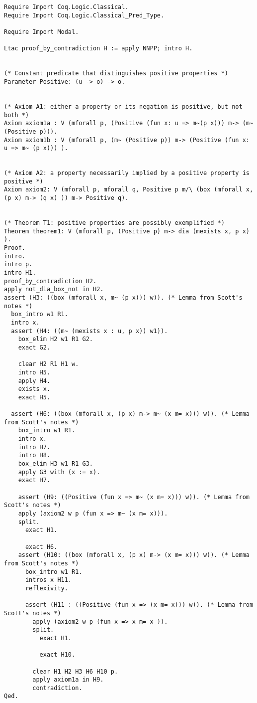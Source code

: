 \documentclass{llncs}
\begin{document}
\begin{verbatim}
Require Import Coq.Logic.Classical.
Require Import Coq.Logic.Classical_Pred_Type.

Require Import Modal.

Ltac proof_by_contradiction H := apply NNPP; intro H.


(* Constant predicate that distinguishes positive properties *)
Parameter Positive: (u -> o) -> o.


(* Axiom A1: either a property or its negation is positive, but not both *)
Axiom axiom1a : V (mforall p, (Positive (fun x: u => m~(p x))) m-> (m~ (Positive p))).
Axiom axiom1b : V (mforall p, (m~ (Positive p)) m-> (Positive (fun x: u => m~ (p x))) ).


(* Axiom A2: a property necessarily implied by a positive property is positive *)
Axiom axiom2: V (mforall p, mforall q, Positive p m/\ (box (mforall x, (p x) m-> (q x) )) m-> Positive q).


(* Theorem T1: positive properties are possibly exemplified *)
Theorem theorem1: V (mforall p, (Positive p) m-> dia (mexists x, p x) ).
Proof.
intro.
intro p.
intro H1.
proof_by_contradiction H2.
apply not_dia_box_not in H2.
assert (H3: ((box (mforall x, m~ (p x))) w)). (* Lemma from Scott's notes *)
  box_intro w1 R1.
  intro x.
  assert (H4: ((m~ (mexists x : u, p x)) w1)).
    box_elim H2 w1 R1 G2. 
    exact G2.

    clear H2 R1 H1 w.
    intro H5.
    apply H4.
    exists x.
    exact H5.

  assert (H6: ((box (mforall x, (p x) m-> m~ (x m= x))) w)). (* Lemma from Scott's notes *)    
    box_intro w1 R1.
    intro x.
    intro H7.
    intro H8.
    box_elim H3 w1 R1 G3.
    apply G3 with (x := x).
    exact H7.

    assert (H9: ((Positive (fun x => m~ (x m= x))) w)). (* Lemma from Scott's notes *)
    apply (axiom2 w p (fun x => m~ (x m= x))).
    split.
      exact H1.

      exact H6.
    assert (H10: ((box (mforall x, (p x) m-> (x m= x))) w)). (* Lemma from Scott's notes *)
      box_intro w1 R1.
      intros x H11.     
      reflexivity.

      assert (H11 : ((Positive (fun x => (x m= x))) w)). (* Lemma from Scott's notes *)
        apply (axiom2 w p (fun x => x m= x )).
        split.
          exact H1.

          exact H10.

        clear H1 H2 H3 H6 H10 p.
        apply axiom1a in H9.
        contradiction.
Qed.



\end{verbatim}
\end{document}
